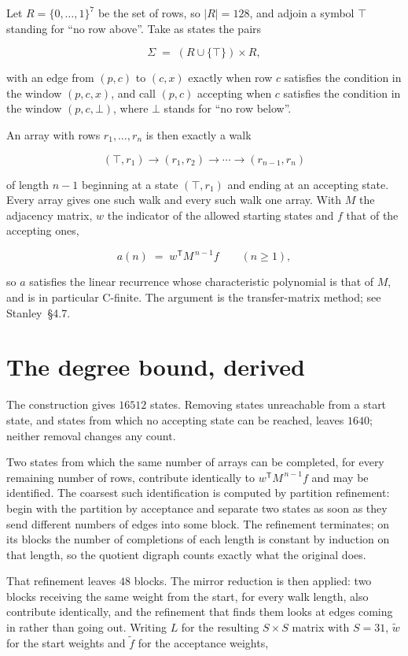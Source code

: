 \documentclass[11pt]{article}
\theoremstyle{definition}
\begin{document}
Let $R = \{0,\dots,1\}^{7}$ be the set of rows, so $|R| = 128$, and adjoin a symbol $\top$ standing for ``no row above''. Take as states the pairs

\[\Sigma \;=\; (R \cup \{\top\}) \times R,\]

with an edge from $(p,c)$ to $(c,x)$ exactly when row $c$ satisfies the condition in the window $(p,c,x)$, and call $(p,c)$ accepting when $c$ satisfies the condition in the window $(p,c,\bot)$, where $\bot$ stands for ``no row below''.

An array with rows $r_1,\dots,r_n$ is then exactly a walk

\[(\top,r_1) \to (r_1,r_2) \to \cdots \to (r_{n-1},r_n)\]

of length $n-1$ beginning at a state $(\top,r_1)$ and ending at an accepting state. Every array gives one such walk and every such walk one array. With $M$ the adjacency matrix, $w$ the indicator of the allowed starting states and $f$ that of the accepting ones,

\[a(n) \;=\; w^{\mathsf T} M^{\,n-1} f \qquad (n \ge 1),\]

so $a$ satisfies the linear recurrence whose characteristic polynomial is that of $M$, and is in particular C-finite. The argument is the transfer-matrix method; see Stanley~\S4.7.

\section{The degree bound, derived}

The construction gives $16512$ states. Removing states unreachable from a start state, and states from which no accepting state can be reached, leaves $1640$; neither removal changes any count.

Two states from which the same number of arrays can be completed, for every remaining number of rows, contribute identically to $w^{\mathsf T}M^{\,n-1}f$ and may be identified. The coarsest such identification is computed by partition refinement: begin with the partition by acceptance and separate two states as soon as they send different numbers of edges into some block. The refinement terminates; on its blocks the number of completions of each length is constant by induction on that length, so the quotient digraph counts exactly what the original does.

That refinement leaves $48$ blocks. The mirror reduction is then applied: two blocks receiving the same weight from the start, for every walk length, also contribute identically, and the refinement that finds them looks at edges coming in rather than going out. Writing $L$ for the resulting $S \times S$ matrix with $S = 31$, $\tilde w$ for the start weights and $\tilde f$ for the acceptance weights,
\end{document}
